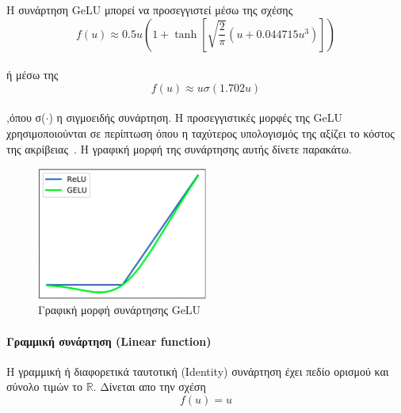 \documentclass[12pt]{article}
\numberwithin{equation}{section}
\begin{document}
\noindent Η συνάρτηση GeLU μπορεί να προσεγγιστεί μέσω της σχέσης \\

\begin{equation}
f(u) \approx 0.5u \left(1 + \tanh\left[\sqrt{\frac{2}{\pi}} \left(u + 0.044715u^3\right)\right]\right)
\end{equation}\\

\noindent ή μέσω της \\

\begin{equation}
f(u) \approx u \sigma(1.702u)
\end{equation} \\

\noindent ,όπου σ(\(\cdot\)) η σιγμοειδής συνάρτηση. Η προσεγγιστικές μορφές της GeLU χρησιμοποιούνται σε περίπτωση όπου η ταχύτερος υπολογισμός της αξίζει το κόστος της ακρίβειας~\cite{hendrycks2023gaussianerrorlinearunits}. Η γραφική μορφή της συνάρτησης αυτής δίνετε παρακάτω.\\


\begin{figure}[h!]
  \centering
  \includegraphics[width=0.5\textwidth]{images/GeLU.png} %
  \caption{Γραφική μορφή συνάρτησης GeLU}
  \label{figure 14}
\end{figure}


\paragraph{Γραμμική συνάρτηση (Linear function)\\[0.5cm]}

Η γραμμική ή διαφορετικά ταυτοτική (Identity) συνάρτηση έχει πεδίο ορισμού και σύνολο τιμών το \(\mathbb{R}\). Δίνεται απο την σχέση \\

\begin{equation}
f(u) = u
\end{equation}
\end{document}
